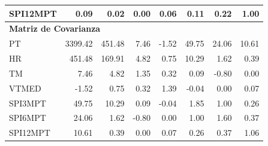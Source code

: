 \begin{table}[ht]
\begin{tabular}{lrrrrrrr}
SPI12MPT & 0.09 & 0.02 & 0.00 & 0.06 & 0.11 & 0.22 & 1.00 \\
\midrule
\multicolumn{8}{l}{\textbf{Matriz de Covarianza}} \\
\midrule
PT       & 3399.42 & 451.48 & 7.46 & -1.52 & 49.75 & 24.06 & 10.61 \\
HR       & 451.48 & 169.91 & 4.82 & 0.75 & 10.29 & 1.62 & 0.39 \\
TM       & 7.46 & 4.82 & 1.35 & 0.32 & 0.09 & -0.80 & 0.00 \\
VTMED    & -1.52 & 0.75 & 0.32 & 1.39 & -0.04 & 0.00 & 0.07 \\
SPI3MPT  & 49.75 & 10.29 & 0.09 & -0.04 & 1.85 & 1.00 & 0.26 \\
SPI6MPT  & 24.06 & 1.62 & -0.80 & 0.00 & 1.00 & 1.60 & 0.37 \\
SPI12MPT & 10.61 & 0.39 & 0.00 & 0.07 & 0.26 & 0.37 & 1.06 \\
\bottomrule
\end{tabular}
\end{table}






